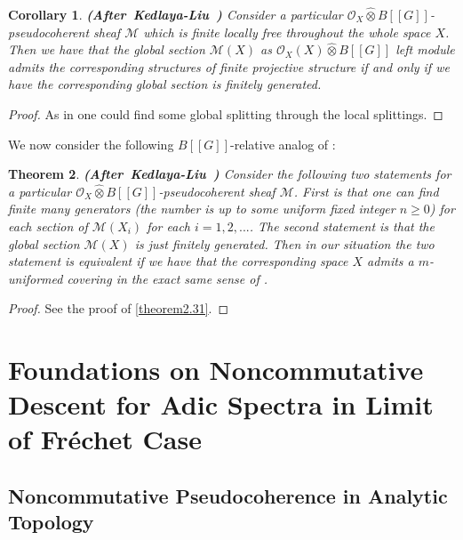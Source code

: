 \documentclass[12pt]{amsart}
\newtheorem{theorem}{Theorem}[section]
\newtheorem{corollary}[theorem]{Corollary}
\theoremstyle{definition}
\numberwithin{equation}{section}
\begin{document}
\begin{corollary}  \mbox{\bf{(After Kedlaya-Liu \cite[Corollary 2.6.8]{KL2})}}
Consider a particular $\mathcal{O}_X\widehat{\otimes}B[[G]]$-pseudocoherent sheaf $\mathcal{M}$ which is finite locally free throughout the whole space $X$. Then we have that the global section $\mathcal{M}(X)$ as $\mathcal{O}_X(X)\widehat{\otimes}B[[G]]$ left module admits the corresponding structures of finite projective structure if and only if we have the corresponding global section is finitely generated.
\end{corollary}

\begin{proof}
As in \cite[Corollary 2.6.8]{KL2} one could find some global splitting through the local splittings.
\end{proof}

\indent We now consider the following $B[[G]]$-relative analog of \cite[Proposition 2.6.17]{KL2}:

\begin{theorem} \mbox{\bf{(After Kedlaya-Liu \cite[Proposition 2.6.17]{KL2})}} \label{theorem3.32}
Consider the following two statements for a particular $\mathcal{O}_X\widehat{\otimes}B[[G]]$-pseudocoherent sheaf $\mathcal{M}$. First is that one can find finite many generators (the number is up to some uniform fixed integer $n\geq 0$) for each section of $\mathcal{M}(X_i)$ for each $i=1,2,...$. The second statement is that the global section $\mathcal{M}(X)$ is just finitely generated. Then in our situation the two statement is equivalent if we have that the corresponding space $X$ admits a $m$-uniformed covering in the exact same sense of \cite[Proposition 2.6.17]{KL2}. 	
\end{theorem}

\begin{proof}
See the proof of \cref{theorem2.31}.
\end{proof}





\newpage 


\section{Foundations on Noncommutative Descent for Adic Spectra in Limit of Fr\'echet Case}

\subsection{Noncommutative Pseudocoherence in Analytic Topology}
\end{document}
